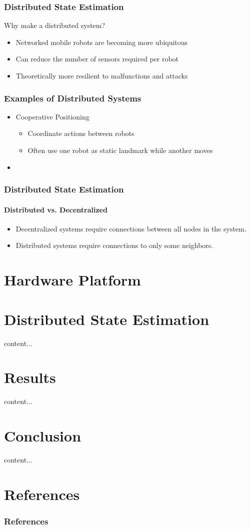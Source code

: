 \documentclass{beamer}
\begin{document}
\begin{frame}
\frametitle{Distributed State Estimation}
Why make a distributed system?
\begin{itemize}
\item Networked mobile robots are becoming more ubiquitous
\item Can reduce the number of sensors required per robot
\item Theoretically more resilient to malfunctions and attacks
\end{itemize}
\end{frame}

\begin{frame}
\frametitle{Examples of Distributed Systems}
\begin{itemize}
\item Cooperative Positioning
    \begin{itemize}
    \item Coordinate actions between robots
    \item Often use one robot as static landmark while another moves
    \end{itemize}
\item 
\end{itemize}
\end{frame}

\begin{frame}
\frametitle{Distributed State Estimation}
\framesubtitle{Distributed vs. Decentralized}
\begin{itemize}
\item Decentralized systems require connections between all nodes in the system.
\item Distributed systems require connections to only some neighbors.
\end{itemize}
\end{frame}

\section{Hardware Platform}
\begin{frame}

\end{frame}

\section{Distributed State Estimation}
\begin{frame}
content...
\end{frame}

\section{Results}
\begin{frame}
content...
\end{frame}

\section{Conclusion}
\begin{frame}
content...
\end{frame}

\section{References}
\begin{frame}
\frametitle{References}
\printbibliography
\end{frame}
\end{document}
